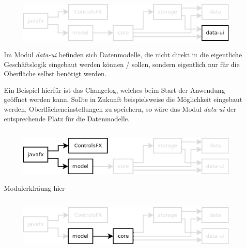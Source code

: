 \subsection{\textModDataUI}
\label{\textModDataUI}
\begin{figure}[h!]
	\centering
	\includegraphics[width=.8\textwidth]{module_dependencies_data-ui.png}
\end{figure}

Im Modul \textit{data-ui} befinden sich Datenmodelle, die nicht direkt in die eigentliche Geschäftslogik
eingebaut werden können / sollen, sondern eigentlich nur für die Oberfläche selbst benötigt werden.

Ein Beispiel hierfür ist das Changelog, welches beim Start der Anwendung geöffnet werden kann.
Sollte in Zukunft beispielsweise die Möglichkeit eingebaut werden, Oberflächeneinstellungen zu speichern, 
so wäre das Modul \textit{data-ui} der entsprechende Platz für die Datenmodelle.

\subsection{\textModJavaFX}
\label{\textModJavaFX}
\begin{figure}[h!]
	\centering
	\includegraphics[width=.8\textwidth]{module_dependencies_javafx.png}
\end{figure}

Modulerklräung hier




\subsection{\textModModel}
\label{\textModModel}
\begin{figure}[h!]
	\centering
	\includegraphics[width=.8\textwidth]{module_dependencies_model.png}
\end{figure}

